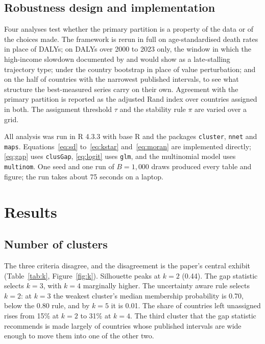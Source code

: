 \documentclass[11pt,a4paper]{article}
\begin{document}
\subsection{Robustness design and implementation}

Four analyses test whether the primary partition is a property of the data or of the choices made. The framework is rerun in full on age-standardised death rates in place of DALYs; on DALYs over 2000 to 2023 only, the window in which the high-income slowdown documented by \citet{lopez2019} and \citet{dowd2025} would show as a late-stalling trajectory type; under the country bootstrap in place of value perturbation; and on the half of countries with the narrowest published intervals, to see what structure the best-measured series carry on their own. Agreement with the primary partition is reported as the adjusted Rand index over countries assigned in both. The assignment threshold $\tau$ and the stability rule $\pi$ are varied over a grid.

All analysis was run in R 4.3.3 with base R and the packages \texttt{cluster}, \texttt{nnet} and \texttt{maps}. Equations~\eqref{eq:sd} to~\eqref{eq:kstar} and~\eqref{eq:moran} are implemented directly; \eqref{eq:gap} uses \texttt{clusGap}, \eqref{eq:logit} uses \texttt{glm}, and the multinomial model uses \texttt{multinom}. One seed and one run of $B = 1{,}000$ draws produced every table and figure; the run takes about 75 seconds on a laptop.

\section{Results}\label{sec:results}

\subsection{Number of clusters}

The three criteria disagree, and the disagreement is the paper's central exhibit (Table~\ref{tab:k}, Figure~\ref{fig:k}). Silhouette peaks at $k = 2$ (0.44). The gap statistic selects $k = 3$, with $k = 4$ marginally higher. The uncertainty aware rule selects $k = 2$: at $k = 3$ the weakest cluster's median membership probability is 0.70, below the 0.80 rule, and by $k = 5$ it is 0.01. The share of countries left unassigned rises from 15\% at $k = 2$ to 31\% at $k = 4$. The third cluster that the gap statistic recommends is made largely of countries whose published intervals are wide enough to move them into one of the other two.
\end{document}

